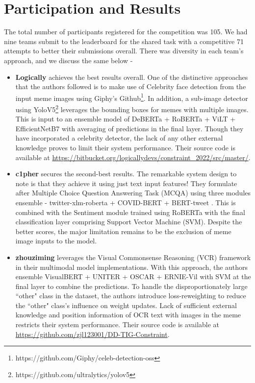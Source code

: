 \documentclass[11pt]{article}
\begin{document}



\section{Participation and Results}
\label{sec:partres}
The total number of participants registered for the competition was 105. We had nine teams submit to the leaderboard for the shared task with a competitive 71 attempts to better their submissions overall. There was diversity in each team's approach, and we discuss the same below - 

\begin{itemize}
    \item \textbf{Logically} achieves the best results overall. One of the distinctive approaches that the authors followed is to make use of Celebrity face detection from the input meme images using Giphy's Github\footnote{https://github.com/Giphy/celeb-detection-oss}. In addition, a sub-image detector using YoloV5\footnote{https://github.com/ultralytics/yolov5} leverages the bounding boxes for memes with multiple images. This is input to an ensemble model of DeBERTa \citep{he_deberta_2021} + RoBERTa \citep{liu_roberta_2019} + ViLT \citep{kim_vilt_2021} + EfficientNetB7 \citep{tan_efficientnet_2020} with averaging of predictions in the final layer. Though they have incorporated a celebrity detector, the lack of any other external knowledge proves to limit their system performance. Their source code is available at \url{https://bitbucket.org/logicallydevs/constraint_2022/src/master/}.
    \item \textbf{c1pher} secures the second-best results. The remarkable system design to note is that they achieve it using just text input features! They formulate after Multiple Choice Question Answering Task (MCQA) using three modules ensemble - twitter-xlm-roberta + COVID-BERT \citep{muller_covid-twitter-bert_2020} + BERT-tweet \citep{nguyen_bertweet_2020}. This is combined with the Sentiment module trained using RoBERTa with the final classification layer comprising Support Vector Machine (SVM). Despite the better scores, the major limitation remains to be the exclusion of meme image inputs to the model. 
    \item \textbf{zhouziming} leverages the Visual Commonsense Reasoning (VCR) framework in their multimodal model implementations. With this approach, the authors ensemble VisualBERT \citep{li_visualbert_2019} + UNITER \citep{chen_uniter_2020} + OSCAR \citep{li_oscar_2020} + ERNIE-Vil \citep{yu_ernie-vil_2021} with SVM at the final layer to combine the predictions. To handle the disproportionately large ``other" class in the dataset, the authors introduce loss-reweighting to reduce the ``other" class's influence on weight updates. Lack of sufficient external knowledge and position information of OCR text with images in the meme restricts their system performance. Their source code is available at \url{https://github.com/zjl123001/DD-TIG-Constraint}.

\end{itemize}
\end{document}

